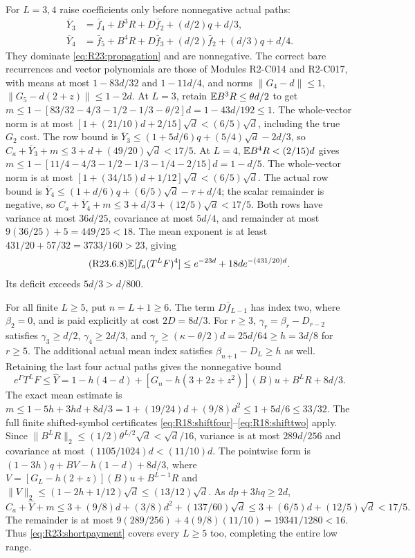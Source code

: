 For $L=3,4$ raise coefficients only before nonnegative actual paths:
\[
\begin{aligned}
\overline Y_3&=\bar f_4+B^3R+D\bar f_2+(d/2)q+d/3,\\
\overline Y_4&=\bar f_5+B^4R+D\bar f_3+(d/2)\bar f_2+(d/3)q+d/4.
\end{aligned}
\]
They dominate \eqref{eq:R23:propagation} and are nonnegative.
The correct bare recurrences and vector polynomials are those of
Modules R2-C014 and R2-C017, with means at most $1-83d/32$ and
$1-11d/4$, and norms $\|G_4-d\|\le1$,
$\|G_5-d(2+z)\|\le1-2d$.
At $L=3$, retain $\mathbb E B^3R\le\theta d/2$ to get
$m\le1-[83/32-4/3-1/2-1/3-\theta/2]d=1-43d/192\le1$.
The whole-vector norm is at most
$[1+(21/10)d+2/15]\sqrt d<(6/5)\sqrt d$, including the true
$G_2$ cost. The row bound is
$\overline Y_3\le(1+5d/6)q+(5/4)\sqrt d-2d/3$,
so $C_a+\overline Y_3+m\le3+d+(49/20)\sqrt d<17/5$.
At $L=4$, $\mathbb E B^4R<(2/15)d$ gives
$m\le1-[11/4-4/3-1/2-1/3-1/4-2/15]d=1-d/5$.
The whole-vector norm is at most
$[1+(34/15)d+1/12]\sqrt d<(6/5)\sqrt d$.
The actual row bound is
$\overline Y_4\le(1+d/6)q+(6/5)\sqrt d-\tau+d/4$;
the scalar remainder is negative, so
$C_a+\overline Y_4+m\le3+d/3+(12/5)\sqrt d<17/5$.
Both rows have variance at most $36d/25$, covariance at most $5d/4$,
and remainder at most $9(36/25)+5=449/25<18$.
The mean exponent is at least $431/20+57/32=3733/160>23$, giving
\begin{equation}\tag{R23.6.8}\label{eq:R23:middlepayment}
\mathbb E[f_a(T^LF)^4]\le e^{-23d}+18de^{-(431/20)d}.
\end{equation}
Its deficit exceeds $5d/3>d/800$.

For all finite $L\ge5$, put $n=L+1\ge6$. The term
$D\bar f_{L-1}$ has index two, where $\beta_2=0$, and is paid
explicitly at cost $2D=8d/3$.
For $r\ge3$, $\gamma_r=\beta_r-D_{r-2}$ satisfies
$\gamma_3\ge d/2$, $\gamma_4\ge2d/3$, and
$\gamma_r\ge(\kappa-\theta/2)d=25d/64\ge h=3d/8$ for $r\ge5$.
The additional actual mean index satisfies
$\beta_{n+1}-D_L\ge h$ as well.
Retaining the last four actual paths gives the nonnegative bound
\[
e^\Gamma T^LF\le\widehat Y
=1-h(4-d)+[G_n-h(3+2z+z^2)](B)u+B^LR+8d/3.
\]
The exact mean estimate is
$m\le1-5h+3hd+8d/3
=1+(19/24)d+(9/8)d^2\le1+5d/6\le33/32$.
The full finite shifted-symbol certificates
\eqref{eq:R18:shiftfour}--\eqref{eq:R18:shifttwo} apply.
Since $\|B^LR\|_2\le(1/2)\theta^{L/2}\sqrt d<\sqrt d/16$,
variance is at most $289d/256$ and covariance at most
$(1105/1024)d<(11/10)d$.
The pointwise form is $(1-3h)q+BV-h(1-d)+8d/3$, where
$V=[G_L-h(2+z)](B)u+B^{L-1}R$ and
$\|V\|_2\le(1-2h+1/12)\sqrt d\le(13/12)\sqrt d$.
As $dp+3hq\ge2d$,
\[
C_a+\widehat Y+m\le3+(9/8)d+(3/8)d^2+(137/60)\sqrt d
\le3+(6/5)d+(12/5)\sqrt d<17/5.
\]
The remainder is at most
$9(289/256)+4(9/8)(11/10)=19341/1280<16$.
Thus \eqref{eq:R23:shortpayment} covers every $L\ge5$ too,
completing the entire low range.

